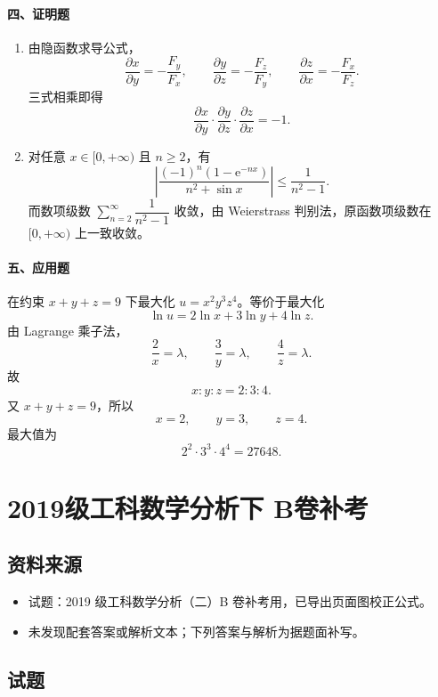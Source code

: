 \paragraph*{四、证明题}
\begin{enumerate}
  \item 由隐函数求导公式，
  \[
    \frac{\partial x}{\partial y}=-\frac{F_y}{F_x},\qquad
    \frac{\partial y}{\partial z}=-\frac{F_z}{F_y},\qquad
    \frac{\partial z}{\partial x}=-\frac{F_x}{F_z}.
  \]
  三式相乘即得
  \[
    \frac{\partial x}{\partial y}\cdot
    \frac{\partial y}{\partial z}\cdot
    \frac{\partial z}{\partial x}=-1.
  \]

  \item 对任意 \(x\in[0,+\infty)\) 且 \(n\ge2\)，有
  \[
    \left|\frac{(-1)^n(1-\mathrm{e}^{-nx})}{n^2+\sin x}\right|
    \le\frac1{n^2-1}.
  \]
  而数项级数 \(\sum_{n=2}^{\infty}\dfrac1{n^2-1}\) 收敛，由 Weierstrass 判别法，原函数项级数在 \([0,+\infty)\) 上一致收敛。
\end{enumerate}

\paragraph*{五、应用题}
在约束 \(x+y+z=9\) 下最大化 \(u=x^2y^3z^4\)。等价于最大化
\[
  \ln u=2\ln x+3\ln y+4\ln z.
  \]
由 Lagrange 乘子法，
\[
  \frac2x=\lambda,\qquad \frac3y=\lambda,\qquad \frac4z=\lambda.
  \]
故
\[
  x:y:z=2:3:4.
  \]
又 \(x+y+z=9\)，所以
\[
  x=2,\qquad y=3,\qquad z=4.
  \]
最大值为
\[
  2^2\cdot3^3\cdot4^4=27648.
\]

\section{2019级工科数学分析下 B卷补考}

\subsection{资料来源}
\begin{itemize}
  \item 试题：2019 级工科数学分析（二）B 卷补考用，已导出页面图校正公式。
  \item 未发现配套答案或解析文本；下列答案与解析为据题面补写。
\end{itemize}

\subsection{试题}

